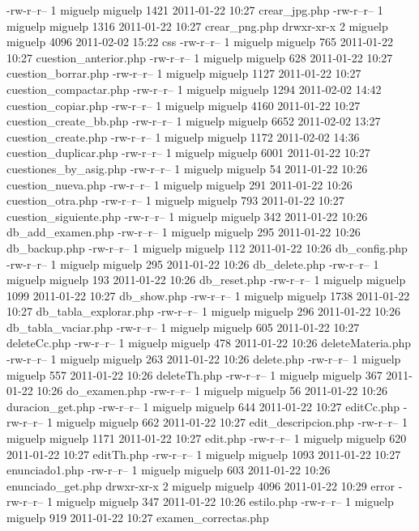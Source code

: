 -rw-r--r--  1 miguelp miguelp     1421 2011-01-22 10:27 crear_jpg.php
-rw-r--r--  1 miguelp miguelp     1316 2011-01-22 10:27 crear_png.php
drwxr-xr-x  2 miguelp miguelp     4096 2011-02-02 15:22 css
-rw-r--r--  1 miguelp miguelp      765 2011-01-22 10:27 cuestion_anterior.php
-rw-r--r--  1 miguelp miguelp      628 2011-01-22 10:27 cuestion_borrar.php
-rw-r--r--  1 miguelp miguelp     1127 2011-01-22 10:27 cuestion_compactar.php
-rw-r--r--  1 miguelp miguelp     1294 2011-02-02 14:42 cuestion_copiar.php
-rw-r--r--  1 miguelp miguelp     4160 2011-01-22 10:27 cuestion_create_bb.php
-rw-r--r--  1 miguelp miguelp     6652 2011-02-02 13:27 cuestion_create.php
-rw-r--r--  1 miguelp miguelp     1172 2011-02-02 14:36 cuestion_duplicar.php
-rw-r--r--  1 miguelp miguelp     6001 2011-01-22 10:27 cuestiones_by_asig.php
-rw-r--r--  1 miguelp miguelp       54 2011-01-22 10:26 cuestion_nueva.php
-rw-r--r--  1 miguelp miguelp      291 2011-01-22 10:26 cuestion_otra.php
-rw-r--r--  1 miguelp miguelp      793 2011-01-22 10:27 cuestion_siguiente.php
-rw-r--r--  1 miguelp miguelp      342 2011-01-22 10:26 db_add_examen.php
-rw-r--r--  1 miguelp miguelp      295 2011-01-22 10:26 db_backup.php
-rw-r--r--  1 miguelp miguelp      112 2011-01-22 10:26 db_config.php
-rw-r--r--  1 miguelp miguelp      295 2011-01-22 10:26 db_delete.php
-rw-r--r--  1 miguelp miguelp      193 2011-01-22 10:26 db_reset.php
-rw-r--r--  1 miguelp miguelp     1099 2011-01-22 10:27 db_show.php
-rw-r--r--  1 miguelp miguelp     1738 2011-01-22 10:27 db_tabla_explorar.php
-rw-r--r--  1 miguelp miguelp      296 2011-01-22 10:26 db_tabla_vaciar.php
-rw-r--r--  1 miguelp miguelp      605 2011-01-22 10:27 deleteCc.php
-rw-r--r--  1 miguelp miguelp      478 2011-01-22 10:26 deleteMateria.php
-rw-r--r--  1 miguelp miguelp      263 2011-01-22 10:26 delete.php
-rw-r--r--  1 miguelp miguelp      557 2011-01-22 10:26 deleteTh.php
-rw-r--r--  1 miguelp miguelp      367 2011-01-22 10:26 do_examen.php
-rw-r--r--  1 miguelp miguelp       56 2011-01-22 10:26 duracion_get.php
-rw-r--r--  1 miguelp miguelp      644 2011-01-22 10:27 editCc.php
-rw-r--r--  1 miguelp miguelp      662 2011-01-22 10:27 edit_descripcion.php
-rw-r--r--  1 miguelp miguelp     1171 2011-01-22 10:27 edit.php
-rw-r--r--  1 miguelp miguelp      620 2011-01-22 10:27 editTh.php
-rw-r--r--  1 miguelp miguelp     1093 2011-01-22 10:27 enunciado1.php
-rw-r--r--  1 miguelp miguelp      603 2011-01-22 10:26 enunciado_get.php
drwxr-xr-x  2 miguelp miguelp     4096 2011-01-22 10:29 error
-rw-r--r--  1 miguelp miguelp      347 2011-01-22 10:26 estilo.php
-rw-r--r--  1 miguelp miguelp      919 2011-01-22 10:27 examen_correctas.php

